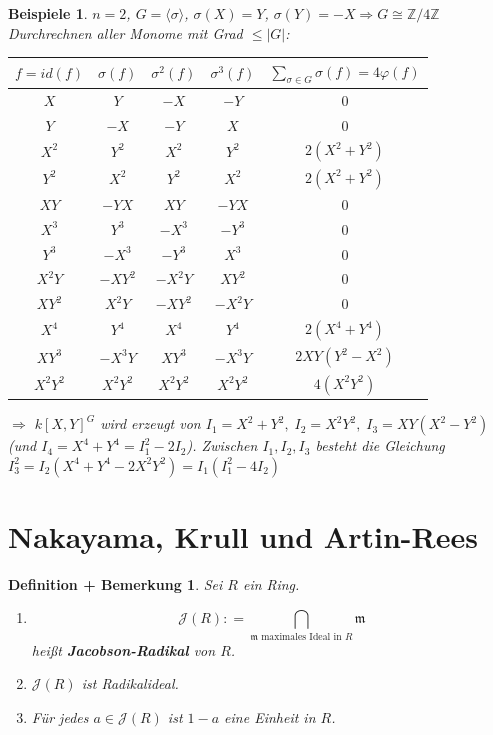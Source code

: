 \documentclass[a4paper,12pt]{scrbook}
\theoremstyle{break}
\newtheorem{DefBem}[Def]{Definition + Bemerkung}
\theoremstyle{nonumberbreak}
\newtheorem{nnBsp}{Beispiele}
\theoremstyle{nonumberplain}
\newcommand{\emp}[1]{\textbf{\emph{#1}}}
\newcommand{\defeqr}[0]{\mathrel{\mathop:}=}
\begin{document}
\begin{nnBsp}
$n=2$, $G=\langle \sigma \rangle$, $\sigma(X) = Y$, $\sigma(Y) = -X \Rightarrow G \cong \mathbb{Z}/4\mathbb{Z}$\\
Durchrechnen aller Monome mit Grad $\leq |G|$:

{\footnotesize
\begin{tabular}{|cccc|c|}
  \hline
  $f = id(f)$ & $\sigma(f)$ & $\sigma^2(f)$ & $\sigma^3(f)$ & $\sum_{\sigma \in G} \sigma(f) = 4 \varphi(f)$ \\
  \hline
  $X$ & $Y$ & $-X$ & $-Y$ & $0$ \\
  $Y$ & $-X$ & $-Y$ & $X$ & $0$ \\
  $X^2$ & $Y^2$ & $X^2$ & $Y^2$ & $2(X^2+Y^2)$ \\
  $Y^2$ & $X^2$ & $Y^2$ & $X^2$ & $2(X^2+Y^2)$ \\
  $XY$ & $-YX$ & $XY$ & $-YX$ & $0$ \\
  $X^3$ & $Y^3$ & $-X^3$ & $-Y^3$ & $0$ \\
  $Y^3$ & $-X^3$ & $-Y^3$ & $X^3$ & $0$ \\
  $X^2Y$ & $-XY^2$ & $-X^2Y$ & $X Y^2$ & $0$ \\
  $X Y^2$ & $X^2Y$ & $-XY^2$ & $-X^2Y$ & $0$ \\
  $X^4$ & $Y^4$ & $X^4$ & $Y^4$ & $2(X^4+Y^4)$ \\
  $XY^3$ & $-X^3Y$ & $XY^3$ & $-X^3Y$ & $2XY(Y^2-X^2)$ \\
  $X^2Y^2$ & $X^2Y^2$ & $X^2Y^2$ & $X^2Y^2$ & $4(X^2Y^2)$ \\
  \hline
\end{tabular}}

$\Rightarrow$ $k[X,Y]^G$ wird erzeugt von $I_1 = X^2+Y^2, \; I_2 = X^2Y^2, \; I_3 = XY(X^2-Y^2)$ (und $I_4 = X^4 + Y^4 = I_1^2-2I_2$). Zwischen $I_1,I_2,I_3$ besteht die Gleichung $I_3^2 = I_2(X^4+Y^4-2X^2Y^2)=I_1(I_1^2-4I_2)$
\end{nnBsp}
\section{Nakayama, Krull und Artin-Rees}

\begin{DefBem}

Sei $R$ ein Ring.
\begin{enumerate}
\item $$\mathcal{J}(R) \defeqr \bigcap_{\mathfrak{m}\text{ maximales Ideal in }R}\mathfrak{m}$$ heißt \emp{Jacobson-Radikal} von $R$.
\item $\mathcal{J}(R)$ ist Radikalideal.
\item \label{2.20c} Für jedes $a \in \mathcal{J}(R)$ ist $1-a$ eine Einheit in $R$.
\end{enumerate}

\end{DefBem}
\end{document}

